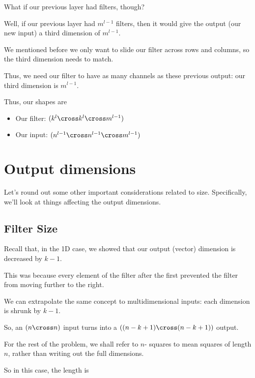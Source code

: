         
        What if our previous layer had filters, though?
            
        Well, if our previous layer had $m^{l-1}$ filters, then it would give the output (our new input) a third dimension of $m^{l-1}$.
        
        We mentioned before we only want to slide our filter across rows and columns, so the third dimension needs to match.
        
        Thus, we need our filter to have as many channels as these previous output: our third dimension is $m^{l-1}$.
        
        Thus, our shapes are
        
        \begin{itemize}
            \item  Our filter: $(k^l \cross k^l \cross m^{l-1})$
            \item  Our input: $(n^{l-1} \cross n^{l-1} \cross m^{l-1})$
        \end{itemize}
        
    
\section{Output dimensions}

    Let's round out some other important considerations related to size. Specifically, we'll look at things affecting the output dimensions.
    
    \subsection{Filter Size}
    
        Recall that, in the 1D case, we showed that our output (vector) dimension is decreased by $k-1$.
        
        This was because every element of the filter after the first prevented the filter from moving further to the right.
        
        We can extrapolate the same concept to multidimensional inputs: each dimension is shrunk by $k-1$.
        
        So, an $(n \cross n)$ input turns into a $( (n-k+1) \cross (n-k+1) )$ output.
        
        For the rest of the problem, we shall refer to $n$- squares to mean squares of length $n$, rather than writing out the full dimensions.
        
        So in this case, the length is
        
